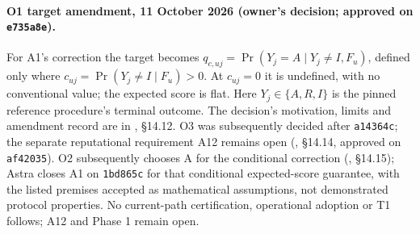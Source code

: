 \paragraph{O1 target amendment, 11 October 2026 (owner's decision; approved on \texttt{e735a8e}).}
For A1's correction the target becomes
$q_{c,uj}=\Pr(Y_j=A\mid Y_j\ne I,F_u)$, defined only where
$c_{uj}=\Pr(Y_j\ne I\mid F_u)>0$. At $c_{uj}=0$ it is undefined, with no conventional
value; the expected score is flat. Here $Y_j\in\{A,R,I\}$ is the pinned reference
procedure's terminal outcome. The decision's motivation, limits and amendment record are
in , \S14.12. O3 was subsequently decided after \texttt{a14364c}; the
separate reputational requirement A12 remains open (, \S14.14, approved on
\texttt{af42035}). O2 subsequently chooses A for the conditional correction
(, \S14.15); Astra closes A1 on \texttt{1bd865c} for that conditional
expected-score guarantee, with the listed premises accepted as mathematical assumptions,
not demonstrated protocol properties. No current-path certification, operational adoption
or T1 follows; A12 and Phase 1 remain open.

